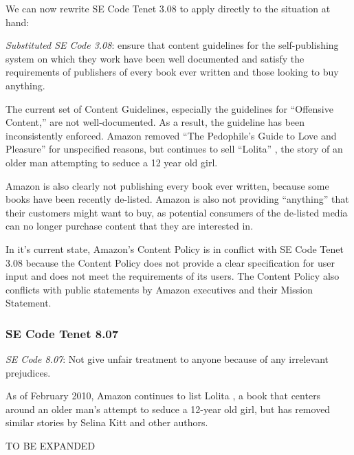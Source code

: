 \documentclass[11pt]{article}
\begin{document}
\begin{multicols}{2}
We can now rewrite SE Code Tenet 3.08 to apply directly to the situation at hand:

\emph{Substituted SE Code 3.08}: ensure that content guidelines for the self-publishing system on which they work have been well documented and satisfy the requirements of publishers of every book ever written and those looking to buy anything.

The current set of Content Guidelines, especially the guidelines for ``Offensive Content,'' are not well-documented.  As a result, the guideline has been inconsistently enforced.  Amazon removed ``The Pedophile's Guide to Love and Pleasure'' for unspecified reasons, but continues to sell ``Lolita'' \cite{AmazonLolitaDTPListing}, the story of an older man attempting to seduce a 12 year old girl. 

Amazon is also clearly not publishing every book ever written, because some books have been recently de-listed.  Amazon is also not providing ``anything'' that their customers might want to buy, as potential consumers of the de-listed media can no longer purchase content that they are interested in.

In it's current state, Amazon's Content Policy is in conflict with SE Code Tenet 3.08 because the Content Policy does not provide a clear specification for user input and does not meet the requirements of its users.  The Content Policy also conflicts with public statements by Amazon executives and their Mission Statement.

\subsubsection{SE Code Tenet 8.07}

\emph{SE Code 8.07}: Not give unfair treatment to anyone because of any irrelevant prejudices.

As of February 2010, Amazon continues to list Lolita \cite{AmazonLolitaDTPListing}, a book that centers around an older man's attempt to seduce a 12-year old girl, but has removed similar stories by Selina Kitt and other authors. \cite{KittSelfPubRevolution} 

TO BE EXPANDED




\end{multicols}
\end{document}
